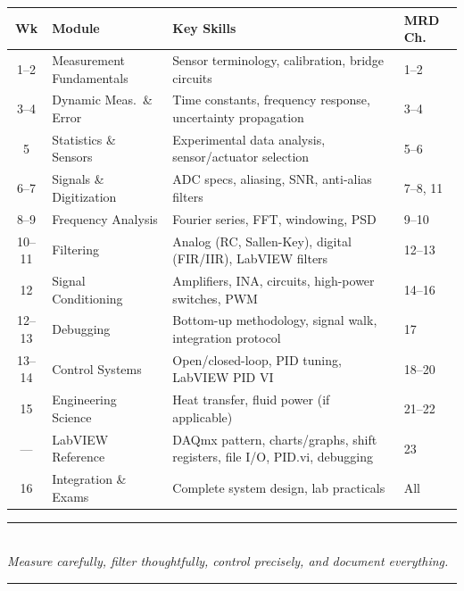 \documentclass[11pt,letterpaper]{article}
\begin{document}
\begin{table}[htbp]
\centering\small
\begin{tabularx}{\textwidth}{@{} c l X l @{}}
\toprule
\textbf{Wk} & \textbf{Module} & \textbf{Key Skills} & \textbf{MRD Ch.} \\
\midrule
1--2 & Measurement Fundamentals & Sensor terminology, calibration, bridge circuits & 1--2 \\
3--4 & Dynamic Meas.\ \& Error & Time constants, frequency response, uncertainty propagation & 3--4 \\
5 & Statistics \& Sensors & Experimental data analysis, sensor/actuator selection & 5--6 \\
6--7 & Signals \& Digitization & ADC specs, aliasing, SNR, anti-alias filters & 7--8, 11 \\
8--9 & Frequency Analysis & Fourier series, FFT, windowing, PSD & 9--10 \\
10--11 & Filtering & Analog (RC, Sallen-Key), digital (FIR/IIR), LabVIEW filters & 12--13 \\
12 & Signal Conditioning & Amplifiers, INA, circuits, high-power switches, PWM & 14--16 \\
12--13 & Debugging & Bottom-up methodology, signal walk, integration protocol & 17 \\
13--14 & Control Systems & Open/closed-loop, PID tuning, LabVIEW PID VI & 18--20 \\
15 & Engineering Science & Heat transfer, fluid power (if applicable) & 21--22 \\
--- & LabVIEW Reference & DAQmx pattern, charts/graphs, shift registers, file I/O, PID.vi, debugging & 23 \\
16 & Integration \& Exams & Complete system design, lab practicals & All \\
\bottomrule
\end{tabularx}
\end{table}

\vspace{1cm}
\begin{center}
\textcolor{minesblue}{\rule{0.4\textwidth}{1pt}}\\[6pt]
\textit{Measure carefully, filter thoughtfully, control precisely, and document everything.}\\[6pt]
\textcolor{minesblue}{\rule{0.4\textwidth}{1pt}}
\end{center}
\end{document}
